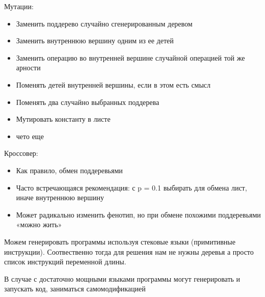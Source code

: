 Мутации:
\begin{itemize}
	\item Заменить поддерево случайно сгенерированным деревом
	\item Заменить внутреннюю вершину одним из ее детей
	\item Заменить операцию во внутренней вершине случайной операцией той же арности
	\item Поменять детей внутренней вершины, если в этом есть смысл
	\item Поменять два случайно выбранных поддерева
	\item Мутировать константу в листе
	\item чето еще
\end{itemize}

Кроссовер:
\begin{itemize}
	\item Как правило, обмен поддеревьями
	\item Часто встречающаяся рекомендация: с p = 0.1 выбирать для обмена лист, иначе внутреннюю вершину
	\item Может радикально изменить фенотип, но при обмене похожими поддеревьями «можно жить»
\end{itemize}

Можем генерировать программы используя стековые языки (примитивные инструкции).
Соотвественно тогда для решения нам не нужны деревья а просто список инструкций переменной длины.

В случае с достаточно мощными языками программы могут генерировать и запускать код, заниматься самомодификацией
